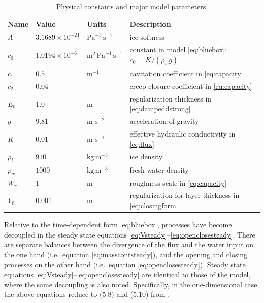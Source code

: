 \documentclass[11pt,final]{amsart}%
\begin{document}
\begin{table}[ht]
  \centering
  \caption{Physical constants and major model parameters.}
  \begin{tabular}{lllp{3.0in}} 
    \textbf{Name} & \textbf{Value} & \textbf{Units} & \textbf{Description}\\
\hline
    $A$ & $3.1689\times 10^{-24}$ & $\text{Pa}^{-3}\,\text{s}^{-1}$ & ice softness \citep{EISMINT96} \phantom{$\Big|$} \\
    $c_0$ & $1.0194\times 10^{-6}$ & $\text{m}^{2}\,\text{Pa}^{-1}\,\text{s}^{-1}$ & constant in model \eqref{eq:bluebox}: $c_0=K/(\rho_w g)$ \phantom{$\Big|$} \\
    $c_1$ & $0.5$ & $\text{m}^{-1}$ & cavitation coefficient in \eqref{eq:capacity} \\
    $c_2$ & $0.04$ & & creep closure coefficient in \eqref{eq:capacity} \\
    $E_0$ & $1.0$ & m & regularization thickness in \eqref{eq:dampeddstrong} \\
    $g$ & $9.81$ & m $\text{s}^{-2}$ & acceleration of gravity \\
    $K$ & $0.01$ & m $\text{s}^{-1}$ & effective hydraulic conductivity in \eqref{eq:flux} \\ %
    $\rho_i$ & $910$ & $\text{kg}\,\text{m}^{-3}$ & ice density \citep{GreveBlatter2009} \\
    $\rho_w$ & $1000$ & $\text{kg}\,\text{m}^{-3}$ & fresh water density \citep{GreveBlatter2009} \\
    $W_r$ & $1$ & $\text{m}$ & roughness scale in \eqref{eq:capacity} \\
    $Y_0$ & $0.001$ & m & regularization for layer thickness in \eqref{eq:closingform} \\
    \hline
  \end{tabular}
 \label{tab:constants}
\end{table}

Relative to the time-dependent form \eqref{eq:bluebox}, processes have become decoupled in the steady state equations \eqref{eq:Vsteady}--\eqref{eq:openclosesteady}.  There are separate balances between the divergence of the flux and the water input on the one hand (i.e.~equation \eqref{eq:masscontsteady}), and the opening and closing processes on the other hand (i.e.~equation \eqref{eq:openclosesteady}).  Steady state equations \eqref{eq:Vsteady}--\eqref{eq:openclosesteady} are identical to those of the \cite{Schoofetal2012} model, where the same decoupling is also noted.  Specifically, in the one-dimensional case the above equations reduce to (5.8) and (5.10) from \cite{Schoofetal2012}.
\end{document}
